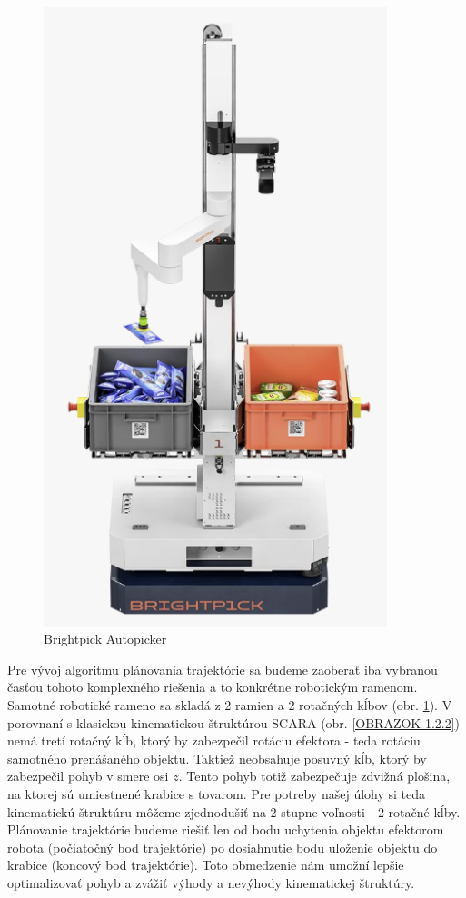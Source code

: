 \begin{figure}[h!]
	\centering
	\includegraphics[width=100mm]{img/autopicker.png}
	\caption{Brightpick Autopicker }\label{OBRAZOK 1.2.1} 
\end{figure} 

Pre vývoj algoritmu plánovania trajektórie sa budeme zaoberať iba vybranou časťou tohoto komplexného riešenia a to konkrétne robotickým ramenom. Samotné robotické rameno sa skladá z 2 ramien a 2 rotačných kĺbov (obr. \ref{OBRAZOK 1.2.1}).  V porovnaní s klasickou kinematickou štruktúrou SCARA (obr. \ref{OBRAZOK 1.2.2}) nemá tretí rotačný kĺb, ktorý by zabezpečil rotáciu efektora - teda rotáciu samotného prenášaného objektu. Taktiež neobsahuje posuvný kĺb, ktorý by zabezpečil pohyb v smere osi $z$. Tento pohyb totiž zabezpečuje zdvižná plošina, na ktorej sú umiestnené krabice s tovarom. Pre potreby našej úlohy si teda kinematickú štruktúru môžeme zjednodušiť na 2 stupne voľnosti - 2 rotačné kĺby. Plánovanie trajektórie budeme riešiť len od bodu uchytenia objektu efektorom robota (počiatočný bod trajektórie) po dosiahnutie bodu uloženie objektu do krabice (koncový bod trajektórie). Toto obmedzenie nám umožní lepšie optimalizovať pohyb a zvážiť výhody a nevýhody kinematickej štruktúry.

